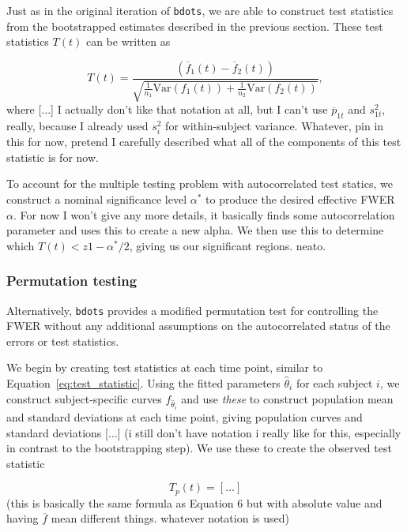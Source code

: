 \documentclass{article}
\newcommand{\xt}{\texttt}%
\begin{document}
Just as in the original iteration of \xt{bdots}, we are able to construct test statistics from the bootstrapped estimates described in the previous section. These test statistics $T(t)$ can be written as 

\begin{equation}\label{eq:test_statistic}
T(t) = \frac{(\overline{f}_{1}(t) - \overline{f}_{2}(t))}{\sqrt{\frac{1}{n_1} \text{Var}(f_1(t)) + \frac{1}{n_2} \text{Var}(f_2(t))}},
\end{equation}
where [$\dots$] I actually don't like that notation at all, but I can't use $\overline{p}_{1t}$ and $s_{1t}^2$, really, because I already used $s_i^2$ for within-subject variance. Whatever, pin in this for now, pretend I carefully described what all of the components of this test statistic is for now.

To account for the multiple testing problem with autocorrelated test statics, we construct a nominal significance level $\alpha^*$ to produce the desired effective FWER $\alpha$. For now I won't give any more details, it basically finds some autocorrelation parameter and uses this to create a new alpha.  We then use this to determine which $T(t) < z{1 -\alpha^*/2}$, giving us our significant regions. neato.

\subsubsection{Permutation testing}

Alternatively, \xt{bdots} provides a modified permutation test for controlling the FWER without any additional assumptions on the autocorrelated status of the errors or test statistics. 

We begin by creating test statistics at each time point, similar to Equation~\ref{eq:test_statistic}. Using the fitted parameters $\hat{\theta}_i$ for each subject $i$, we construct subject-specific curves $f_{\hat{\theta}_i}$ and use \textit{these} to construct population mean and standard deviations at each time point, giving population curves and standard deviations [$\dots$] (i still don't have notation i really like for this, especially in contrast to the bootstrapping step). We use these to create the observed test statistic

\begin{equation}
T_p(t) = [\dots] 
\end{equation}
(this is basically the same formula as Equation 6 but with absolute value and having $\overline{f}$ mean different things. whatever notation is used)
\end{document}
